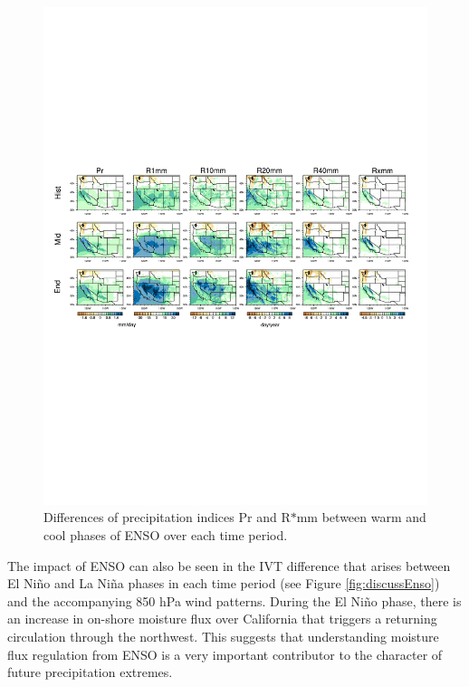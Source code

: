 \begin{figure}
\begin{center}
\includegraphics[width=8in, trim={0.6cm 9.5cm 1.0cm 9.0cm},clip]{wd_index_enso_wetSeason.pdf}
\caption{Differences of precipitation indices Pr and R$\ast$mm between warm and cool phases of ENSO over each time period.}
\label{fig:difEnso}
\end{center}
\end{figure}

The impact of ENSO can also be seen in the IVT difference that arises between El Ni\~no and La Ni\~na phases in each time period (see Figure \ref{fig:discussEnso}) and the accompanying 850 hPa wind patterns.  During the El Ni\~no phase, there is an increase in on-shore moisture flux over California that triggers a returning circulation through the northwest.  This suggests that understanding moisture flux regulation from ENSO is a very important contributor to the character of future precipitation extremes.

